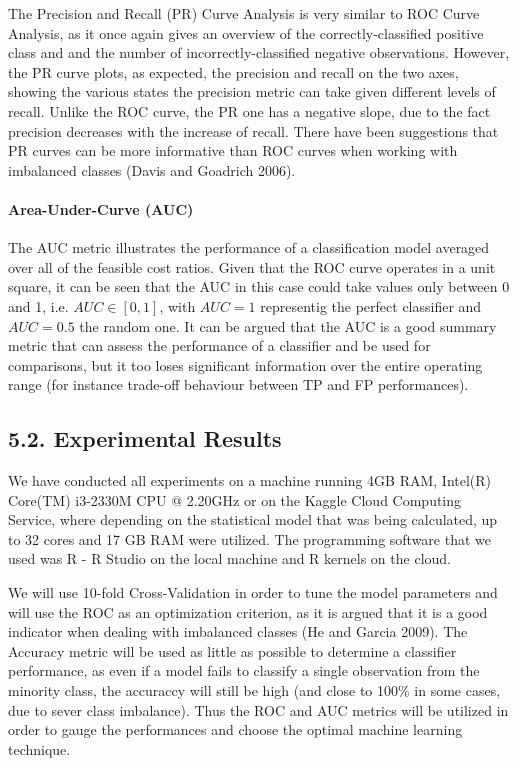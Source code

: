 \documentclass[12pt,]{article}
\let\oldparagraph\paragraph
\renewcommand{\paragraph}[1]{\oldparagraph{#1}\mbox{}}
\begin{document}
The Precision and Recall (PR) Curve Analysis is very similar to ROC
Curve Analysis, as it once again gives an overview of the
correctly-classified positive class and and the number of
incorrectly-classified negative observations. However, the PR curve
plots, as expected, the precision and recall on the two axes, showing
the various states the precision metric can take given different levels
of recall. Unlike the ROC curve, the PR one has a negative slope, due to
the fact precision decreases with the increase of recall. There have
been suggestions that PR curves can be more informative than ROC curves
when working with imbalanced classes (Davis and Goadrich 2006).

\hypertarget{area-under-curve-auc}{%
\paragraph{Area-Under-Curve (AUC)}\label{area-under-curve-auc}}

The AUC metric illustrates the performance of a classification model
averaged over all of the feasible cost ratios. Given that the ROC curve
operates in a unit square, it can be seen that the AUC in this case
could take values only between 0 and 1, i.e. \(AUC \in [0,1]\), with
\(AUC=1\) representig the perfect classifier and \(AUC=0.5\) the random
one. It can be argued that the AUC is a good summary metric that can
assess the performance of a classifier and be used for comparisons, but
it too loses significant information over the entire operating range
(for instance trade-off behaviour between TP and FP performances).

\hypertarget{experimental-results}{%
\subsection{5.2. Experimental Results}\label{experimental-results}}

We have conducted all experiments on a machine running 4GB RAM, Intel(R)
Core(TM) i3-2330M CPU @ 2.20GHz or on the Kaggle Cloud Computing
Service, where depending on the statistical model that was being
calculated, up to 32 cores and 17 GB RAM were utilized. The programming
software that we used was R - R Studio on the local machine and R
kernels on the cloud.

We will use 10-fold Cross-Validation in order to tune the model
parameters and will use the ROC as an optimization criterion, as it is
argued that it is a good indicator when dealing with imbalanced classes
(He and Garcia 2009). The Accuracy metric will be used as little as
possible to determine a classifier performance, as even if a model fails
to classify a single observation from the minority class, the accuraccy
will still be high (and close to 100\% in some cases, due to sever class
imbalance). Thus the ROC and AUC metrics will be utilized in order to
gauge the performances and choose the optimal machine learning
technique.
\end{document}

